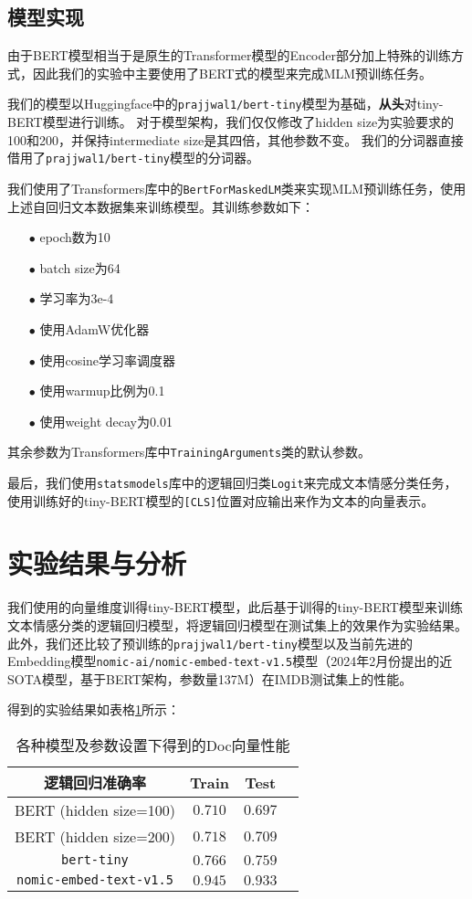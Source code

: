 \documentclass{article}
\begin{document}
\subsection{模型实现}
由于BERT模型相当于是原生的Transformer模型的Encoder部分加上特殊的训练方式，因此我们的实验中主要使用了BERT式的模型来完成MLM预训练任务。

我们的模型以Huggingface中的\verb|prajjwal1/bert-tiny|模型为基础，\textbf{从头}对tiny-BERT模型进行训练。
对于模型架构，我们仅仅修改了hidden size为实验要求的100和200，并保持intermediate size是其四倍，其他参数不变。
我们的分词器直接借用了\verb|prajjwal1/bert-tiny|模型的分词器。

我们使用了Transformers库中的\verb|BertForMaskedLM|类来实现MLM预训练任务，使用上述自回归文本数据集来训练模型。其训练参数如下：
\begin{itemize}
  \item[$\bullet$] epoch数为10
  \item[$\bullet$] batch size为64
  \item[$\bullet$] 学习率为3e-4
  \item[$\bullet$] 使用AdamW优化器
  \item[$\bullet$] 使用cosine学习率调度器
  \item[$\bullet$] 使用warmup比例为0.1
  \item[$\bullet$] 使用weight decay为0.01
\end{itemize}
其余参数为Transformers库中\verb|TrainingArguments|类的默认参数。

最后，我们使用\verb|statsmodels|库中的逻辑回归类\verb|Logit|来完成文本情感分类任务，
使用训练好的tiny-BERT模型的\verb|[CLS]|位置对应输出来作为文本的向量表示。



\section{实验结果与分析}

我们使用的向量维度训得tiny-BERT模型，此后基于训得的tiny-BERT模型来训练文本情感分类的逻辑回归模型，将逻辑回归模型在测试集上的效果作为实验结果。
此外，我们还比较了预训练的\verb|prajjwal1/bert-tiny|模型以及当前先进的Embedding模型\verb|nomic-ai/nomic-embed-text-v1.5|模型（2024年2月份提出的近SOTA模型，基于BERT架构，参数量137M）在IMDB测试集上的性能。

得到的实验结果如表格\ref{tab:results}所示：
\begin{table}[htbp]
  \caption{\small{各种模型及参数设置下得到的Doc向量性能}}
  \label{tab:results}
  \centering
  \begin{tabular}{cccc}
    \toprule
    逻辑回归准确率          & Train   & Test    \\
    \midrule
    BERT (hidden size=100)  & $0.710$ & $0.697$ \\
    \midrule
    BERT (hidden size=200)  & $0.718$ & $0.709$ \\
    \midrule
    \verb|bert-tiny| & $0.766$ & $0.759$ \\
    \midrule
    \verb|nomic-embed-text-v1.5| & $0.945$ & $0.933$ \\
    \bottomrule
  \end{tabular}
\end{table}
\end{document}
